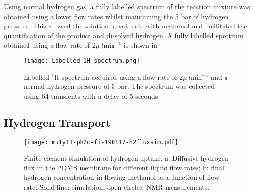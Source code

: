 Using normal hydrogen gas, a fully labelled spectrum of the reaction mixture
was obtained using a lower flow rates whilst maintaining
the 5 bar of hydrogen pressure. This allowed the solution to saturate with
methanol and facilitated the quantification of the product and dissolved hydrogen.
A fully labelled spectrum obtained using a flow rate of 2$\mu~l \text{min}^{-1}$
is shown in 

\begin{figure}
  \begin{center}
  \texttt{[image: Labelled-1H-spectrum.png]}
  \end{center}
  \caption{Labelled $^1$H spectrum acquired using a flow rate of 2$\mu~l \text{min}^{-1}$
  and a normal hydrogen pressure of 5 bar. The spectrum was collected using 64 transients
  with a delay of 5 seconds.}
  \label{fig:LabelledSpec}
\end{figure}

\subsection{Hydrogen Transport}

\begin{figure}
	\texttt{[image: mu1y11-ph2c-fi-190117-h2fluxsim.pdf]}
	\caption{
		Finite element simulation of hydrogen uptake. a: Diffusive hydrogen
		flux in the PDMS membrane for different liquid flow rates;
		b: final hydrogen concentration in flowing methanol as a function of
		flow rate. Solid line: simulation, open circles: NMR measurements.
	}
	\label{fig:h2fluxsim}
\end{figure}

